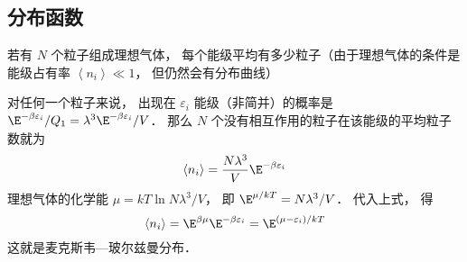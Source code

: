 \subsection{分布函数}
若有 $N$ 个粒子组成理想气体， 每个能级平均有多少粒子（由于理想气体的条件是能级占有率 $\left\langle {{n_i}} \right\rangle \ll 1$，  但仍然会有分布曲线）

对任何一个粒子来说， 出现在 ${\varepsilon_i}$ 能级（非简并）的概率是 ${{{\E^{ - \beta {\varepsilon_i}}}}}/{{{Q_1}}} = {{{\lambda ^3}}}{\E^{ - \beta {\varepsilon_i}}}/{V}$．  那么 $N$ 个没有相互作用的粒子在该能级的平均粒子数就为
\begin{equation}
\left\langle {{n_i}} \right\rangle  = \frac{{N{\lambda ^3}}}{V}{\E^{ - \beta {\varepsilon_i}}}
\end{equation}
理想气体的化学能 $\mu  = kT\ln {{N{\lambda ^3}}}/{V}$，  即 ${\E^{\mu/kT}} = {{N{\lambda ^3}}}/{V}$．  代入上式， 得
\begin{equation}
\left\langle {{n_i}} \right\rangle  = {\E^{\beta \mu }}{\E^{ - \beta {\varepsilon_i}}} = {\E^{(\mu - \varepsilon_i)/kT}}
\end{equation}
这就是麦克斯韦—玻尔兹曼分布．

